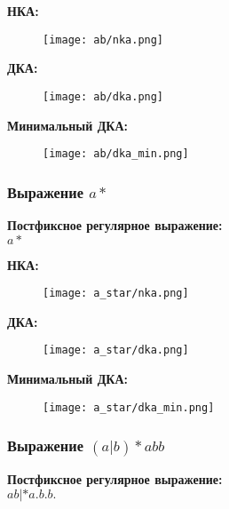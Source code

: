 			\newpage
			\textbf{НКА:}
				\begin{figure}[h!]
					\begin{center}
						\texttt{[image: ab/nka.png]}
					\end{center}
				\end{figure}

			\textbf{ДКА:}
				\begin{figure}[h!]
					\begin{center}
						\texttt{[image: ab/dka.png]}
					\end{center}
				\end{figure}
			
			\newpage
			\textbf{Минимальный ДКА:}
				\begin{figure}[h!]
					\begin{center}
						\texttt{[image: ab/dka\_min.png]}
					\end{center}
				\end{figure}

		
		\subsubsection{Выражение $a*$}
		\textbf{Постфиксное регулярное выражение:}\\
			$a*$

		\textbf{НКА:}
			\begin{figure}[h!]
				\begin{center}
					\texttt{[image: a\_star/nka.png]}
				\end{center}
			\end{figure}

		\newpage
		\textbf{ДКА:}
			\begin{figure}[h!]
				\begin{center}
					\texttt{[image: a\_star/dka.png]}
				\end{center}
			\end{figure}

		\textbf{Минимальный ДКА:}
			\begin{figure}[h!]
				\begin{center}
					\texttt{[image: a\_star/dka\_min.png]}
				\end{center}
			\end{figure}

		\subsubsection{Выражение $(a|b)*abb$}
		\textbf{Постфиксное регулярное выражение:}\\
			$ab|*a.b.b.$

